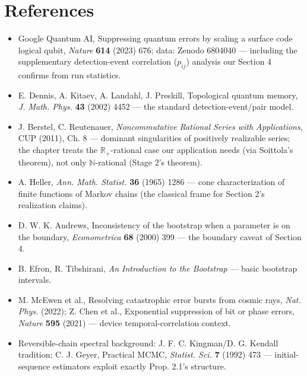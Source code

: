 \documentclass[11pt]{article}
\begin{document}
\section*{References}
\begin{itemize}
\item Google Quantum AI, Suppressing quantum errors by scaling a surface code logical qubit, \emph{Nature} \textbf{614} (2023) 676; data: Zenodo 6804040 — including the supplementary detection-event correlation ($p_{ij}$) analysis our Section 4 confirms from run statistics.
\item E. Dennis, A. Kitaev, A. Landahl, J. Preskill, Topological quantum memory, \emph{J. Math. Phys.} \textbf{43} (2002) 4452 — the standard detection-event/pair model.
\item J. Berstel, C. Reutenauer, \emph{Noncommutative Rational Series with Applications}, CUP (2011), Ch. 8 — dominant singularities of positively realizable series; the chapter treats the $\mathbb R_+$-rational case our application needs (via Soittola's theorem), not only $\mathbb N$-rational (Stage 2's theorem).
\item A. Heller, \emph{Ann. Math. Statist.} \textbf{36} (1965) 1286 — cone characterization of finite functions of Markov chains (the classical frame for Section 2's realization claims).
\item D. W. K. Andrews, Inconsistency of the bootstrap when a parameter is on the boundary, \emph{Econometrica} \textbf{68} (2000) 399 — the boundary caveat of Section 4.
\item B. Efron, R. Tibshirani, \emph{An Introduction to the Bootstrap} — basic bootstrap intervals.
\item M. McEwen et al., Resolving catastrophic error bursts from cosmic rays, \emph{Nat. Phys.} (2022); Z. Chen et al., Exponential suppression of bit or phase errors, \emph{Nature} \textbf{595} (2021) — device temporal-correlation context.
\item Reversible-chain spectral background: J. F. C. Kingman/D. G. Kendall tradition; C. J. Geyer, Practical MCMC, \emph{Statist. Sci.} \textbf{7} (1992) 473 — initial-sequence estimators exploit exactly Prop. 2.1's structure.
\end{itemize}
\end{document}
